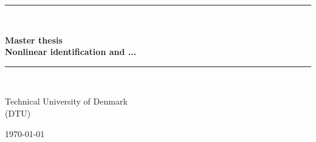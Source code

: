 
{\parindent0pt
  \newcommand{\HRule}{\rule{\textwidth}{1mm}}

  \HRule\\[1cm]
  \begin{center}
    \Huge{\bfseries
      Master thesis\\[0.7cm]
      \large{Nonlinear identification and ...}\\[1cm]
      }
  \end{center}
  \HRule\\[1cm]
  \begin{center}
    Technical University of Denmark\\ (DTU)
  \end{center}
}

\begin{flushleft}
  \today
\end{flushleft}


